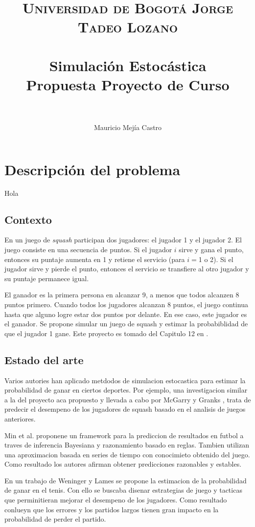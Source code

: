 \documentclass[11pt,letterpaper]{scrartcl}
\title{
	\usefont{OT1}{bch}{b}{n}
	\normalfont \normalsize \textsc{Universidad de Bogotá Jorge Tadeo Lozano} \\ [25pt]
	\horrule{0.5pt} \\[0.4cm]
	\huge Simulación Estocástica \\ Propuesta Proyecto de Curso \\
	\horrule{2pt} \\[0.5cm]
}
\author{Mauricio Mejía Castro}
\begin{document}
	\maketitle
	\tableofcontents
	
	\section{Descripción del problema}
	Hola \cite{ross2014introduction}
		\subsection{Contexto}
		En un juego de \textit{squash} participan dos jugadores: el jugador 1 y el jugador 2. El juego consiste en una secuencia de puntos. Si el jugador $i$ sirve y gana el punto, entonces su puntaje aumenta en 1 y retiene el servicio (para $i=$1 o 2). Si el jugador sirve y pierde el punto, entonces el servicio se transfiere al otro jugador y su puntaje permanece igual.
		
		El ganador es la primera persona en alcanzar 9, a menos que todos alcanzen 8 puntos primero. Cuando todos los jugadores alcanzan 8 puntos, el juego continua hasta que alguno logre estar dos puntos por delante. En ese caso, este jugador es el ganador.
		Se propone simular un juego de squash y estimar la probabiblidad de que el jugador 1 gane. Este proyecto es tomado del Capitulo 12 en \cite{jones2009introduction}.
		
		\subsection{Estado del arte}
		Varios autories han aplicado metdodos de simulacion estocastica para estimar la probabilidad de ganar en ciertos deportes. Por ejemplo, una investigacion similar a la del proyecto aca propuesto y llevada a cabo por McGarry y Granks \cite{mcgarry1994stochastic}, trata de predecir el desempeno de los jugadores de squash basado en el analisis de juegos anteriores.
		
		Min et al. \cite{min2008compound} proponene un framework para la prediccion de resultados en futbol a traves de inferencia Bayesiana y razonamiento basado en reglas. Tambien utilizan una aproximacion basada en series de tiempo con conocimieto obtenido del juego. Como resultado los autores afirman obtener predicciones razonables y estables.
		
		En un trabajo de Weninger y Lames \cite{wenninger2016performance} se propone la estimacion de la probabilidad de ganar en  el tenis. Con ello se buscaba disenar estrategias de juego y tacticas que perminitieran mejorar el desempeno de los jugadores. Como resultado conlueyn que los errores y los partidos largos tienen gran impacto en la probabilidad de perder el partido.
		
\end{document}
